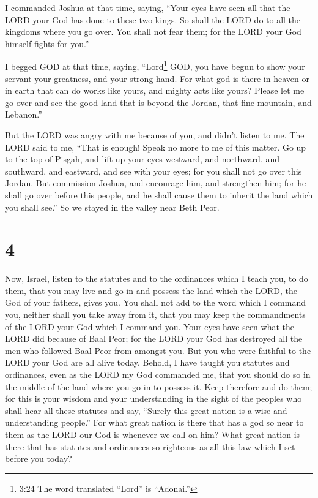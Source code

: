  I commanded Joshua at that time, saying, ``Your eyes have
seen all that the LORD your God has done to these two kings. So shall
the LORD do to all the kingdoms where you go over.  You
shall not fear them; for the LORD your God himself fights for you.''

 I begged GOD at that time, saying, 
``Lord\footnote{3:24 The word translated ``Lord'' is ``Adonai.''} GOD,
you have begun to show your servant your greatness, and your strong
hand. For what god is there in heaven or in earth that can do works like
yours, and mighty acts like yours?  Please let me go over
and see the good land that is beyond the Jordan, that fine mountain, and
Lebanon.''

 But the LORD was angry with me because of you, and didn't
listen to me. The LORD said to me, ``That is enough! Speak no more to me
of this matter.  Go up to the top of Pisgah, and lift up
your eyes westward, and northward, and southward, and eastward, and see
with your eyes; for you shall not go over this Jordan.  But
commission Joshua, and encourage him, and strengthen him; for he shall
go over before this people, and he shall cause them to inherit the land
which you shall see.''  So we stayed in the valley near
Beth Peor.

\hypertarget{section-3}{%
\section{4}\label{section-3}}

 Now, Israel, listen to the statutes and to the ordinances
which I teach you, to do them, that you may live and go in and possess
the land which the LORD, the God of your fathers, gives you.
 You shall not add to the word which I command you, neither
shall you take away from it, that you may keep the commandments of the
LORD your God which I command you.  Your eyes have seen what
the LORD did because of Baal Peor; for the LORD your God has destroyed
all the men who followed Baal Peor from amongst you.  But
you who were faithful to the LORD your God are all alive today.
 Behold, I have taught you statutes and ordinances, even as
the LORD my God commanded me, that you should do so in the middle of the
land where you go in to possess it.  Keep therefore and do
them; for this is your wisdom and your understanding in the sight of the
peoples who shall hear all these statutes and say, ``Surely this great
nation is a wise and understanding people.''  For what great
nation is there that has a god so near to them as the LORD our God is
whenever we call on him?  What great nation is there that
has statutes and ordinances so righteous as all this law which I set
before you today?

